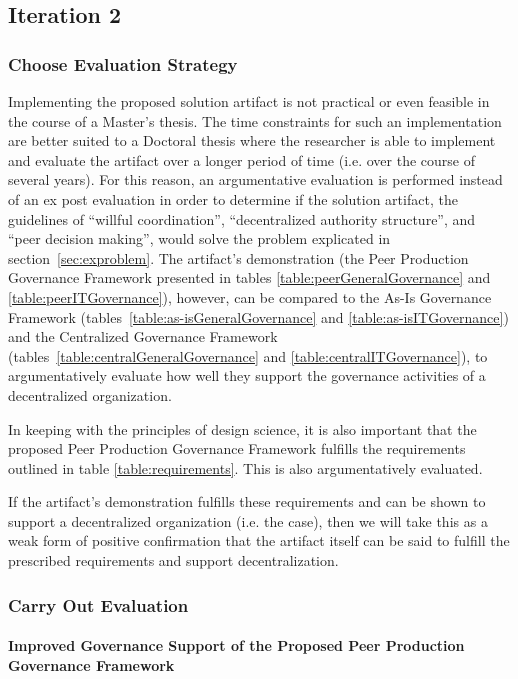 \subsection{Iteration 2}
\subsubsection*{Choose Evaluation Strategy}
\label{section:choose_eval}

Implementing the proposed solution artifact is not practical or even feasible in the course of a Master's thesis. The time constraints for such an implementation are better suited to a Doctoral thesis where the researcher is able to implement and evaluate the artifact over a longer period of time (i.e. over the course of several years). For this reason, an argumentative evaluation is performed instead of an ex post evaluation in order to determine if the solution artifact, the guidelines of ``willful coordination'', ``decentralized authority structure'', and ``peer decision making'', would solve the problem explicated in section~\ref{sec:exproblem}. The artifact's demonstration (the Peer Production Governance Framework presented in tables \ref{table:peerGeneralGovernance} and \ref{table:peerITGovernance}), however, can be compared to the As-Is Governance Framework (tables~\ref{table:as-isGeneralGovernance} and \ref{table:as-isITGovernance}) and the Centralized Governance Framework (tables~\ref{table:centralGeneralGovernance}  and \ref{table:centralITGovernance}), to argumentatively evaluate how well they support the governance activities of a decentralized organization. 

In keeping with the principles of design science, it is also important that the proposed Peer Production Governance Framework fulfills the requirements outlined in table \ref{table:requirements}. This is also argumentatively evaluated. 

If the artifact's demonstration fulfills these requirements and can be shown to support a decentralized organization (i.e. the case), then we will take this as a weak form of positive confirmation  that the artifact itself can be said to fulfill the prescribed requirements and support decentralization.

\subsubsection*{Carry Out Evaluation}

\paragraph*{Improved Governance Support of the Proposed Peer Production Governance Framework}

